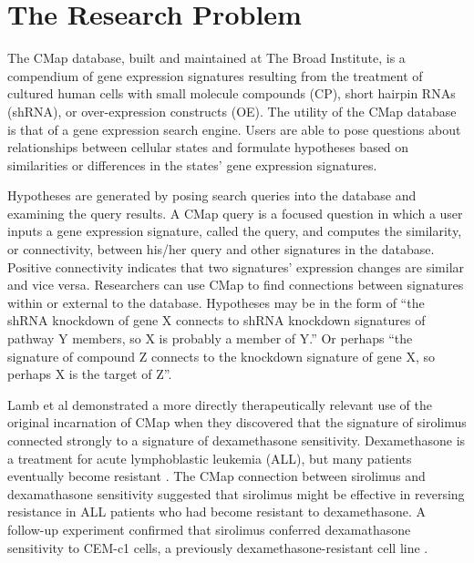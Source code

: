 \documentclass[12pt]{article}
\begin{document}
\doublespacing

\section{The Research Problem}

The CMap database, built and maintained at The Broad Institute, is a compendium of gene expression signatures resulting from the treatment of cultured human cells with small molecule compounds (CP), short hairpin RNAs (shRNA), or over-expression constructs (OE). The utility of the CMap database is that of a gene expression search engine. Users are able to pose questions about relationships between cellular states and formulate hypotheses based on similarities or differences in the states' gene expression signatures.

Hypotheses are generated by posing search queries into the database and examining the query results. A CMap query is a focused question in which a user inputs a gene expression signature, called the query, and computes the similarity, or connectivity, between his/her query and other signatures in the database. Positive connectivity indicates that two signatures' expression changes are similar and vice versa. Researchers can use CMap to find connections between signatures within or external to the database. Hypotheses may be in the form of ``the shRNA knockdown of gene X connects to shRNA knockdown signatures of pathway Y members, so X is probably a member of Y.'' Or perhaps ``the signature of compound Z connects to the knockdown signature of gene X, so perhaps X is the target of Z''.

Lamb et al demonstrated a more directly therapeutically relevant use of the original incarnation of CMap when they discovered that the signature of sirolimus connected strongly to a signature of dexamethasone sensitivity. Dexamethasone is a treatment for acute lymphoblastic leukemia (ALL), but many patients eventually become resistant \cite{tissing_molecular_2003}. The CMap connection between sirolimus and dexamathasone sensitivity suggested that sirolimus might be effective in reversing resistance in ALL patients who had become resistant to dexamethasone. A follow-up experiment confirmed that sirolimus conferred dexamathasone sensitivity to CEM-c1 cells, a previously dexamethasone-resistant cell line \cite{lamb_connectivity_2006}. 
\end{document}
